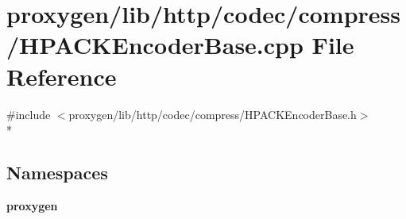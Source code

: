 \section{proxygen/lib/http/codec/compress/\+H\+P\+A\+C\+K\+Encoder\+Base.cpp File Reference}
\label{HPACKEncoderBase_8cpp}
{\ttfamily \#include $<$proxygen/lib/http/codec/compress/\+H\+P\+A\+C\+K\+Encoder\+Base.\+h$>$}\\*
\subsection*{Namespaces}
\begin{DoxyCompactItemize}
\item 
 {\bf proxygen}
\end{DoxyCompactItemize}
